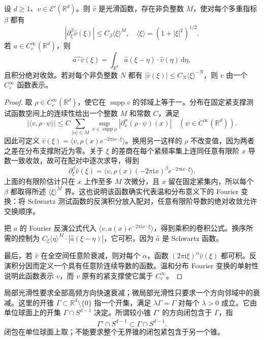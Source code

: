 \begin{lemma}\label{b2:lem:G-compact-fourier}
设 \(d\ge1\)、\(v\in\mathcal E'(\mathbb R^d)\)。则 \(\widehat v\) 是光滑函数，存在非负整数 \(M\)，使对每个多重指标 \(\beta\) 都有
\[
 |\partial_\xi^\beta\widehat v(\xi)|
 \le C_\beta\langle\xi\rangle^M,
 \quad\langle\xi\rangle=(1+|\xi|^2)^{1/2}.
\]
若 \(a\in C_c^\infty(\mathbb R^d)\)，则
\[
 \widehat{a\cdot v}(\xi)
 =\int_{\mathbb R^d}\widehat a(\xi-\eta)\cdot\widehat v(\eta)
       \,\mathrm d\eta,
\]
且积分绝对收敛。若对每个非负整数 \(N\) 都有
\(|\widehat v(\xi)|\le C_N\langle\xi\rangle^{-N}\)，则 \(v\) 由一个 \(C_c^\infty\) 函数表示。
\end{lemma}
\begin{proof}
取 \(\rho\in C_c^\infty(\mathbb R^d)\)，使它在 \(\operatorname{supp}v\) 的邻域上等于一。分布在固定紧支撑测试函数空间上的连续性给出一个整数 \(M\) 和常数 \(C\)，满足
\[
 |\langle v,\rho\cdot\psi\rangle|
 \le C\sum_{|\alpha|\le M}
       \sup_{x\in\operatorname{supp}\rho}
       |\partial_x^\alpha(\rho\cdot\psi)(x)|
 \quad(\psi\in C^\infty(\mathbb R^d)).
\]
因此可定义
\(\widehat v(\xi)=\langle v,\rho(x)e^{-2\pi\mathrm ix\cdot\xi}\rangle\)。换用另一这样的 \(\rho\) 不改变值，因为两者之差在分布支撑附近为零。关于 \(\xi\) 的差商在每个紧频率集上连同任意有限阶 \(x\) 导数一致收敛，故可在配对中逐次求导，得到
\[
 \partial_\xi^\beta\widehat v(\xi)
 =\langle v,\rho(x)(-2\pi\mathrm ix)^\beta
                    e^{-2\pi\mathrm ix\cdot\xi}\rangle.
\]
上面的有限阶估计只在 \(x\) 上作至多 \(M\) 次微分，且 \(x\) 留在固定紧集内，所以每个 \(\beta\) 都取得所述 \(\langle\xi\rangle^M\) 界。这也说明该函数确实代表温和分布意义下的 Fourier 变换：将 Schwartz 测试函数的反演积分放入配对，任意有限阶导数的绝对收敛允许交换顺序。

把 \(a\) 的 Fourier 反演公式代入 \(\langle v,a(x)e^{-2\pi\mathrm ix\cdot\xi}\rangle\)，得到乘积的卷积公式。换序所需的控制为
\(C_\xi\langle\eta\rangle^M\cdot|\widehat a(\xi-\eta)|\)，它可积，因为 \(\widehat a\) 是 Schwartz 函数。

最后，若 \(\widehat v\) 在全空间任意阶衰减，则对每个 \(\alpha\)，函数
\((2\pi\mathrm i\xi)^\alpha\widehat v(\xi)\) 都可积。反演积分因而定义一个具有任意阶连续导数的函数。温和分布 Fourier 变换的单射性说明此函数表示 \(v\)，而 \(v\) 原有的紧支撑使它属于 \(C_c^\infty\)。
\end{proof}

局部光滑性要求全部高频方向快速衰减；微局部光滑性只要求一个方向邻域中的衰减。这里的开锥 \(\Gamma\subset\mathbb R^d\setminus\{0\}\) 指一个开集，满足 \(\lambda\Gamma=\Gamma\) 对每个 \(\lambda>0\) 成立。它由单位球面上的开集 \(\Gamma\cap S^{d-1}\) 决定。所谓较小锥 \(\Gamma'\) 的方向闭包含于 \(\Gamma\)，指
\[
 \overline{\Gamma'\cap S^{d-1}}
 \subset\Gamma\cap S^{d-1}.
\]
闭包在单位球面上取；不能要求整个无界锥的闭包紧包含于另一个锥。

